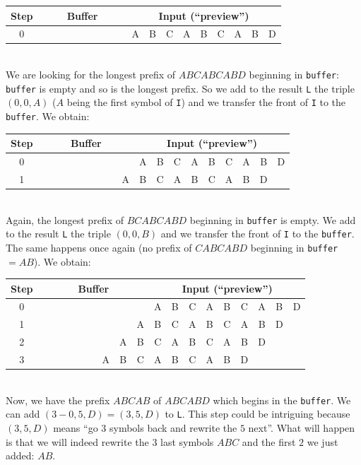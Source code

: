 \documentclass[a4paper,10pt]{article}
\newcommand{\guill}[1]{``#1''}
\begin{document}
\begin{tabular}{|c|c|c|c|c|c|c|c|c|c|c|c|c|c|c|c|c|c|c|}
\hline
\textbf{Step}&\multicolumn{9}{|c|}{\textbf{Buffer}} & \multicolumn{9}{|c|}{\textbf{Input} (\guill{preview})} \\
\hline
0&&&&&&&&&&A&B&C&A&B&C&A&B&D\\
\hline
\end{tabular} \\

We are looking for the longest prefix of $ABCABCABD$ beginning in \texttt{buffer}: \texttt{buffer} is empty and so is the longest prefix. So we add to the result \texttt{L} the triple $(0,0,A)$ ($A$ being the first symbol of \texttt{I}) and we transfer the front of \texttt{I} to the \texttt{buffer}. We obtain: \\

\begin{tabular}{|c|c|c|c|c|c|c|c|c|c|c|c|c|c|c|c|c|c|c|}
\hline
\textbf{Step}&\multicolumn{9}{|c|}{\textbf{Buffer}} & \multicolumn{9}{|c|}{\textbf{Input} (\guill{preview})} \\
\hline
0&&&&&&&&&&A&B&C&A&B&C&A&B&D\\
\hline
1&&&&&&&&&A&B&C&A&B&C&A&B&D&\\
\hline
\end{tabular} \\

Again, the longest prefix of $BCABCABD$ beginning in \texttt{buffer} is empty. We add to the result \texttt{L} the triple $(0,0,B)$ and we transfer the front of \texttt{I} to the \texttt{buffer}. The same happens once again (no prefix of $CABCABD$ beginning in \texttt{buffer}$=AB$). We obtain: \\

\begin{tabular}{|c|c|c|c|c|c|c|c|c|c|c|c|c|c|c|c|c|c|c|}
\hline
\textbf{Step}&\multicolumn{9}{|c|}{\textbf{Buffer}} & \multicolumn{9}{|c|}{\textbf{Input} (\guill{preview})} \\
\hline
0&&&&&&&&&&A&B&C&A&B&C&A&B&D\\
\hline
1&&&&&&&&&A&B&C&A&B&C&A&B&D&\\
\hline
2&&&&&&&&A&B&C&A&B&C&A&B&D&&\\
\hline
3&&&&&&&A&B&C&A&B&C&A&B&D&&&\\
\hline
\end{tabular} \\

Now, we have the prefix $ABCAB$ of $ABCABD$ which begins in the \texttt{buffer}. We can add $(3-0,5,D)=(3,5,D)$ to \texttt{L}. This step could be intriguing because $(3,5,D)$ means \guill{go $3$ symbols back and rewrite the $5$ next}. What will happen is that we will indeed rewrite the $3$ last symbols $ABC$ and the first $2$ we just added: $AB$.
\end{document}
